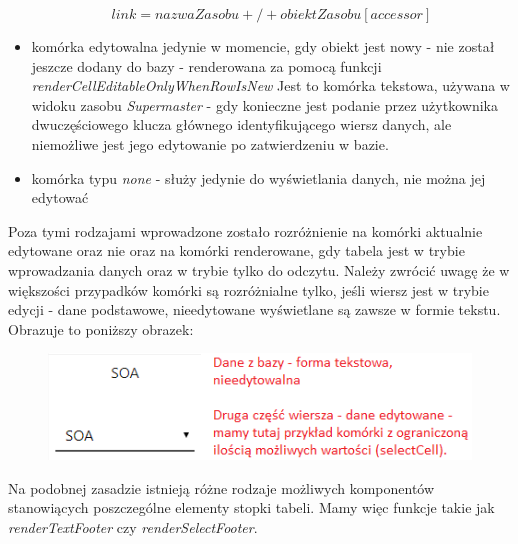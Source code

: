 \documentclass[11pt]{article}
\begin{document}
\begin{itemize}
\begin{equation}
link = nazwaZasobu + / + obiektZasobu[accessor]
\end{equation}
\item komórka edytowalna jedynie w momencie, gdy obiekt jest nowy - nie został jeszcze dodany do bazy - renderowana za pomocą funkcji \emph{renderCellEditableOnlyWhenRowIsNew} Jest to komórka tekstowa, używana w widoku zasobu \emph{Supermaster} - gdy konieczne jest podanie przez użytkownika dwuczęściowego klucza głównego identyfikującego wiersz danych, ale niemożliwe jest jego edytowanie po zatwierdzeniu w bazie.
\item komórka typu \emph{none} - służy jedynie do wyświetlania danych, nie można jej edytować
\end{itemize}
Poza tymi rodzajami wprowadzone zostało rozróżnienie na komórki aktualnie edytowane oraz nie oraz na komórki renderowane, gdy tabela jest w trybie wprowadzania danych oraz w trybie tylko do odczytu. \newline
Należy zwrócić uwagę że w większości przypadków komórki są rozróżnialne tylko, jeśli wiersz jest w trybie edycji - dane podstawowe, nieedytowane wyświetlane są zawsze w formie tekstu. Obrazuje to poniższy obrazek:
\begin{figure}[H]
\centering
\includegraphics[scale=1]{res/front_komorka}
\end{figure}
Na podobnej zasadzie istnieją różne rodzaje możliwych komponentów stanowiących poszczególne elementy stopki tabeli. Mamy więc funkcje takie jak \emph{renderTextFooter} czy \emph{renderSelectFooter}.
\end{document}
